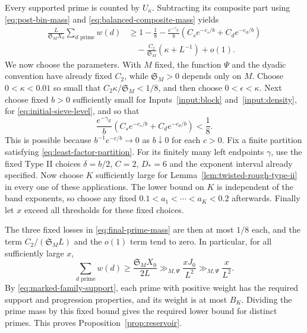 Every supported prime is counted by $U_\kappa$.  Subtracting its
composite part using \eqref{eq:post-bin-mass} and
\eqref{eq:balanced-composite-mass} yields
\begin{equation}\label{eq:final-prime-mass}
 \begin{split}
 \frac{L}{\mathfrak S_M X_0}\sum_{d\text{ prime}}w(d)
 &\ge1-\frac18-\frac{e^{-\gamma_E}}{b}
       \left(C_se^{-c_s/b}+C_de^{-c_d/b}\right)\\
 &\quad-\frac{C_2}{\mathfrak S_M}(\kappa+L^{-1})+o(1).
 \end{split}
\end{equation}
We now choose the parameters.  With $M$ fixed, the function $\Psi$ and
the dyadic convention have already fixed $C_2$, while
$\mathfrak S_M>0$ depends only on $M$.  Choose
$0<\kappa<0.01$ so small that
$C_2\kappa/\mathfrak S_M<1/8$, and then choose
$0<\epsilon<\kappa$.  Next choose fixed $b>0$ sufficiently small
for Inputs~\ref{input:block} and~\ref{input:density}, for
\eqref{eq:initial-sieve-level}, and so that
\[
 \frac{e^{-\gamma_E}}{b}
       \left(C_se^{-c_s/b}+C_de^{-c_d/b}\right)<\frac18.
\]
This is possible because $b^{-1}e^{-c/b}\to0$ as $b\downarrow0$
for each $c>0$.  Fix a finite partition satisfying
\eqref{eq:least-factor-partition}.  For its finitely many left
endpoints $\gamma$, use the fixed Type II choices
$\delta=b/2$, $C=2$, $D_*=6$ and the exponent interval already
specified.  Now choose $K$ sufficiently large for
Lemma~\ref{lem:twisted-rough-type-ii} in every one of these
applications.  The lower bound on $K$ is independent of the band
exponents, so choose any fixed
$0.1<a_1<\cdots<a_K<0.2$ afterwards.  Finally let $x$ exceed all
thresholds for these fixed choices.

The three fixed losses in \eqref{eq:final-prime-mass} are then at
most $1/8$ each, and the term $C_2/(\mathfrak S_M L)$ and the
$o(1)$ term tend to zero.  In particular, for all sufficiently
large $x$,
\[
 \sum_{d\text{ prime}}w(d)
       \ge\frac{\mathfrak S_M X_0}{2L}
       \gg_{M,\Psi}\frac{xJ_0}{L^2}
       \gg_{M,\Psi}\frac{x}{L^2}.
\]
By \eqref{eq:marked-family-support}, each prime with positive weight
has the required support and progression properties, and its
weight is at most $B_K$.  Dividing the prime mass by this fixed
bound gives the required lower bound for distinct primes.
This proves Proposition~\ref{prop:reservoir}.
